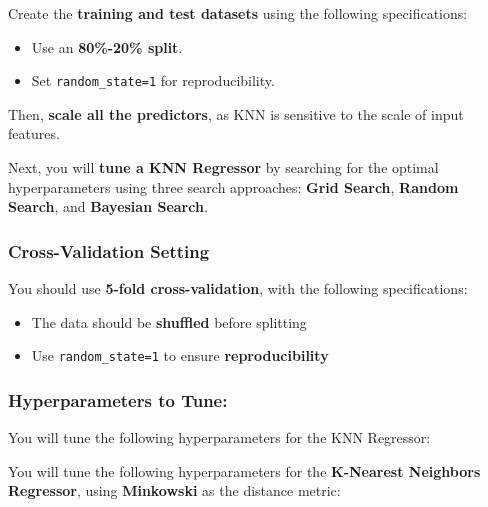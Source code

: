 \documentclass[
  letterpaper,
  DIV=11,
  numbers=noendperiod]{scrreprt}
\providecommand{\tightlist}{%
  \setlength{\itemsep}{0pt}\setlength{\parskip}{0pt}}\usepackage{longtable,booktabs,array}
\begin{document}
Create the \textbf{training and test datasets} using the following
specifications:

\begin{itemize}
\tightlist
\item
  Use an \textbf{80\%-20\% split}.
\item
  Set \texttt{random\_state=1} for reproducibility.
\end{itemize}

Then, \textbf{scale all the predictors}, as KNN is sensitive to the
scale of input features.

Next, you will \textbf{tune a KNN Regressor} by searching for the
optimal hyperparameters using three search approaches: \textbf{Grid
Search}, \textbf{Random Search}, and \textbf{Bayesian Search}.

\subsubsection{Cross-Validation Setting}\label{cross-validation-setting}

You should use \textbf{5-fold cross-validation}, with the following
specifications:

\begin{itemize}
\tightlist
\item
  The data should be \textbf{shuffled} before splitting\\
\item
  Use \texttt{random\_state=1} to ensure \textbf{reproducibility}
\end{itemize}

\subsubsection{Hyperparameters to Tune:}\label{hyperparameters-to-tune}

You will tune the following hyperparameters for the KNN Regressor:

You will tune the following hyperparameters for the \textbf{K-Nearest
Neighbors Regressor}, using \textbf{Minkowski} as the distance metric:
\end{document}
